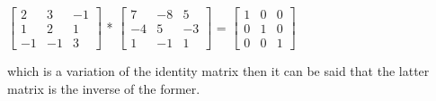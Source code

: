\documentclass[12pt]{article}
\begin{document}
\begin{enumerate}
         $\begin{bmatrix}2 & 3 & -1 \\1 & 2 & 1 \\-1 & -1 & 3\end{bmatrix} $ 
         *
         $\begin{bmatrix}7 & -8 & 5 \\-4 & 5 & -3 \\1 & -1 & 1\end{bmatrix}$
         =
         $\begin{bmatrix}1 & 0 & 0 \\0 & 1 & 0 \\0 & 0 & 1\end{bmatrix}$\newline\newline

         which is a variation of the identity matrix then it can be said that the latter matrix
         is the inverse of the former.

         
        
\end{enumerate}
\end{document}
